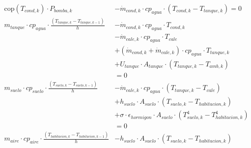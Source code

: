 \begin{align}
	\text{cop}(T_{cond,k}) \cdot P_{bomba,k}                                                    & - \dot{m}_{cond,k} \cdot cp_{agua} \cdot \left(T_{cond,k} - T_{tanque,k}\right) = 0                     \\
	m_{tanque} \cdot cp_{agua} \cdot \frac{\left(T_{tanque,k} - T_{tanque,k-1}\right)}{h}       & - \dot{m}_{cond,k} \cdot cp_{agua} \cdot T_{cond,k} \nonumber                                           \\
	                                                                                            & - \dot{m}_{cale,k} \cdot cp_{agua} \cdot T_{cale} \nonumber                                             \\
	                                                                                            & + (\dot{m}_{cond,k} + \dot{m}_{cale,k}) \cdot cp_{agua} \cdot T_{tanque,k} \nonumber                    \\
	                                                                                            & + U_{tanque} \cdot A_{tanque} \cdot (T_{tanque,k} - T_{amb,k}) \nonumber                                \\
	                                                                                            & = 0                                                                                                     \\
	m_{suelo} \cdot cp_{suelo} \cdot \frac{\left(T_{suelo,k} - T_{suelo,k-1}\right)}{h}         & - \dot{m}_{cale,k} \cdot cp_{agua} \cdot (T_{tanque,k} - T_{cale}) \nonumber                            \\
	                                                                                            & + h_{suelo} \cdot A_{suelo} \cdot (T_{suelo,k} - T_{habitacion,k}) \nonumber                            \\
	                                                                                            & + \sigma \cdot \epsilon_{hormigon} \cdot A_{suelo} \cdot (T_{suelo,k}^4 - T_{habitacion,k}^4) \nonumber \\
	                                                                                            & = 0                                                                                                     \\
	m_{aire} \cdot cp_{aire} \cdot \frac{\left(T_{habitacion,k} - T_{habitacion,k-1}\right)}{h} & - h_{suelo} \cdot A_{suelo} \cdot (T_{suelo,k} - T_{habitacion,k}) \nonumber                            \\

\end{align}
